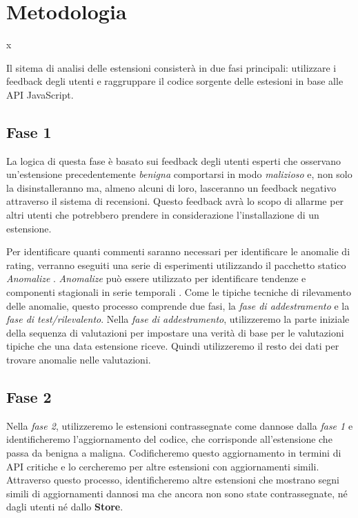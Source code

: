 \documentclass[ 11pt, oneside, italian, onehalfspacing, headsepline, ]{MastersDoctoralThesis}
\begin{document}
{\chapter{Metodologia}}x

Il sitema di analisi delle estensioni consisterà in due fasi principali: utilizzare i feedback degli utenti e raggruppare il codice sorgente delle estesioni in base alle API JavaScript.

{\section{Fase 1}}

La logica di questa fase è basato sui feedback degli utenti esperti che osservano un'estensione precedentemente  \textit{benigna} comportarsi in modo  \textit{malizioso} e, non solo la disinstalleranno ma, almeno alcuni di loro, lasceranno un feedback negativo attraverso il sistema di recensioni. Questo feedback avrà lo scopo di allarme per altri utenti che potrebbero prendere in considerazione l'installazione di un estensione. \par

Per identificare quanti commenti saranno necessari per identificare le anomalie di rating, verranno eseguiti una serie di esperimenti utilizzando il pacchetto statico \textit{Anomalize} \citep{Anomalize}. \textit{Anomalize} può essere utilizzato per identificare tendenze e componenti stagionali in serie temporali \citep{GeneralizedExtremeStudentized}. Come le tipiche tecniche di rilevamento delle anomalie, questo processo comprende due fasi, la \textit{fase di addestramento} e la \textit{fase di test/rilevalento}. Nella \textit{fase di addestramento}, utilizzeremo la parte iniziale della sequenza di valutazioni per impostare una verità di base per le valutazioni tipiche che una data estensione riceve. Quindi utilizzeremo il resto dei dati per trovare anomalie nelle valutazioni.

{\section{Fase 2}}

Nella \textit{fase 2}, utilizzeremo le estensioni contrassegnate come dannose dalla \textit{fase 1} e identificheremo l'aggiornamento del codice, che corrisponde all'estensione che passa da benigna a maligna. Codificheremo questo aggiornamento  in termini di API critiche e lo cercheremo per altre estensioni con aggiornamenti simili. Attraverso questo processo, identificheremo altre estensioni che mostrano segni simili di aggiornamenti dannosi ma che ancora non sono state contrassegnate, né dagli utenti né dallo \textbf{Store}.
\end{document}
